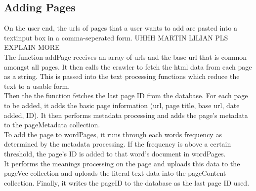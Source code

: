 \subsection{Adding Pages}
On the user end, the urls of pages that a user wants to add are pasted into a textinput box in a comma-seperated form. UHHH MARTIN LILIAN PLS EXPLAIN MORE \\

The function addPage receives an array of urls and the base url that is common amongst all pages. It then calls the crawler to fetch the html data from each page as a string. This is passed into the text processing functions which reduce the text to a usable form. \\
Then the the function fetches the last page ID from the database. For each page to be added, it adds the basic page information (url, page title, base url, date added, ID). It then performs metadata processing and adds the page's metadata to the pageMetadata collection. \\
To add the page to wordPages, it runs through each words frequency as determined by the metadata processing. If the frequency is above a certain threshold, the page's ID is added to that word's document in wordPages. \\
It performs the meanings processing on the page and uploads this data to the pageVec collection and uploads the literal text data into the pageContent collection. Finally, it writes the pageID to the database as the last page ID used.
